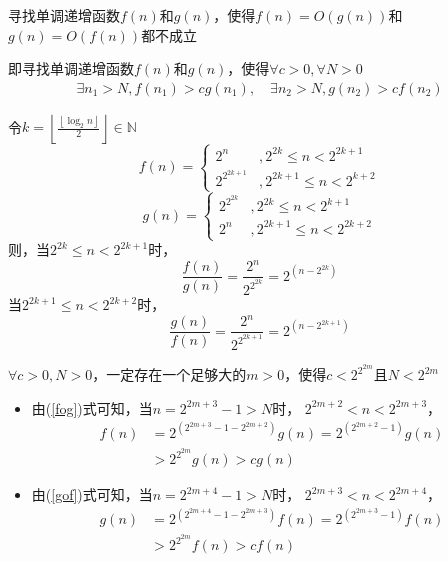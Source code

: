 \documentclass[answers]{exam}
\begin{document}
\begin{questions}
    \newpage

    \question 寻找单调递增函数$f(n)$和$g(n)$，使得$f(n)=O(g(n))$和$g(n)=O(f(n))$都不成立

    \begin{solution}
        即寻找单调递增函数$f(n)$和$g(n)$，使得$\forall c > 0, \forall N > 0$ \begin{align*}
            \exists n_1 > N, f(n_1) > c g(n_1) , \quad
            \exists n_2 > N, g(n_2) > c f(n_2)
        \end{align*}

        令$k = \left\lfloor \frac{\left\lfloor \log_2{n} \right\rfloor}{2} \right\rfloor \in\mathbb{N}$
        $$
            f(n) = \begin{cases}
                2^n          & , 2^{2k} \leq n < 2^{2k+1}  \\
                2^{2^{2k+1}} & , 2^{2k+1} \leq n < 2^{k+2}
            \end{cases}
        $$
        $$
            g(n) = \begin{cases}
                2^{2^{2k}} & , 2^{2k} \leq n < 2^{k+1}    \\
                2^n        & , 2^{2k+1} \leq n < 2^{2k+2}
            \end{cases}
        $$
        则，当$2^{2k} \leq n < 2^{2k+1}$时，
        \begin{equation} \label{fog}
            \frac{f(n)}{g(n)} = \frac{2^n}{2^{2^{2k}}} = 2^{(n-2^{2k})}
        \end{equation}
        当$2^{2k+1} \leq n < 2^{2k+2}$时，
        \begin{equation} \label{gof}
            \frac{g(n)}{f(n)} = \frac{2^n}{2^{2^{2k+1}}} = 2^{(n-2^{2k+1})}
        \end{equation}

        $\forall c > 0, N > 0$，一定存在一个足够大的$m > 0$，使得$c < 2^{2^{2m}}$且$N < 2^{2m}$
        \begin{itemize}
            \item 由(\ref{fog})式可知，当$n = 2^{2m+3}-1 > N$时，
                  $2^{2m+2} < n < 2^{2m + 3}$，
                  \begin{align*}
                      f(n) & = 2^{(2^{2m+3}-1-2^{2m+2})} g(n) = 2^{(2^{2m+2}-1)} g(n) \\
                           & > 2^{2^{2m}} g(n) > c g(n)
                  \end{align*}
            \item 由(\ref{gof})式可知，当$n = 2^{2m+4}-1 > N$时，
                  $2^{2m + 3} < n < 2^{2m + 4}$，
                  \begin{align*}
                      g(n) & = 2^{(2^{2m+4}-1-2^{2m+3})} f(n) = 2^{(2^{2m+3}-1)} f(n) \\
                           & > 2^{2^{2m}} f(n) > c f(n)
                  \end{align*}
        \end{itemize}


\end{solution}
\end{questions}
\end{document}
